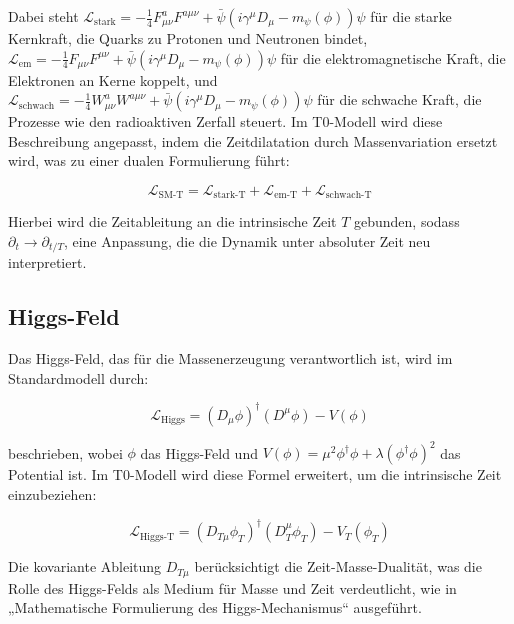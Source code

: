 \documentclass[a4paper,12pt]{article}
\begin{document}
	Dabei steht \(\mathcal{L}_\text{stark} = -\frac{1}{4} F_{\mu\nu}^a F^{a\mu\nu} + \bar{\psi}(i \gamma^\mu D_\mu - m_\psi(\phi))\psi\) für die starke Kernkraft, die Quarks zu Protonen und Neutronen bindet, \(\mathcal{L}_\text{em} = -\frac{1}{4} F_{\mu\nu} F^{\mu\nu} + \bar{\psi}(i \gamma^\mu D_\mu - m_\psi(\phi))\psi\) für die elektromagnetische Kraft, die Elektronen an Kerne koppelt, und \(\mathcal{L}_\text{schwach} = -\frac{1}{4} W_{\mu\nu}^a W^{a\mu\nu} + \bar{\psi}(i \gamma^\mu D_\mu - m_\psi(\phi))\psi\) für die schwache Kraft, die Prozesse wie den radioaktiven Zerfall steuert. Im T0-Modell wird diese Beschreibung angepasst, indem die Zeitdilatation durch Massenvariation ersetzt wird, was zu einer dualen Formulierung führt:
	
	\begin{equation}
		\mathcal{L}_\text{SM-T} = \mathcal{L}_\text{stark-T} + \mathcal{L}_\text{em-T} + \mathcal{L}_\text{schwach-T}
	\end{equation}
	
	Hierbei wird die Zeitableitung an die intrinsische Zeit \(T\) gebunden, sodass \(\partial_t \rightarrow \partial_{t/T}\), eine Anpassung, die die Dynamik unter absoluter Zeit neu interpretiert.
	
	\subsection{Higgs-Feld}
	
	Das Higgs-Feld, das für die Massenerzeugung verantwortlich ist, wird im Standardmodell durch:
	
	\begin{equation}
		\mathcal{L}_\text{Higgs} = (D_\mu \phi)^\dagger (D^\mu \phi) - V(\phi)
	\end{equation}
	
	beschrieben, wobei \(\phi\) das Higgs-Feld und \(V(\phi) = \mu^2 \phi^\dagger \phi + \lambda (\phi^\dagger \phi)^2\) das Potential ist. Im T0-Modell wird diese Formel erweitert, um die intrinsische Zeit einzubeziehen:
	
	\begin{equation}
		\mathcal{L}_\text{Higgs-T} = (D_{T\mu} \phi_T)^\dagger (D_T^\mu \phi_T) - V_T(\phi_T)
	\end{equation}
	
	Die kovariante Ableitung \(D_{T\mu}\) berücksichtigt die Zeit-Masse-Dualität, was die Rolle des Higgs-Felds als Medium für Masse und Zeit verdeutlicht, wie in „Mathematische Formulierung des Higgs-Mechanismus“ \cite{pascher_higgs_2025} ausgeführt.
	
\end{document}
